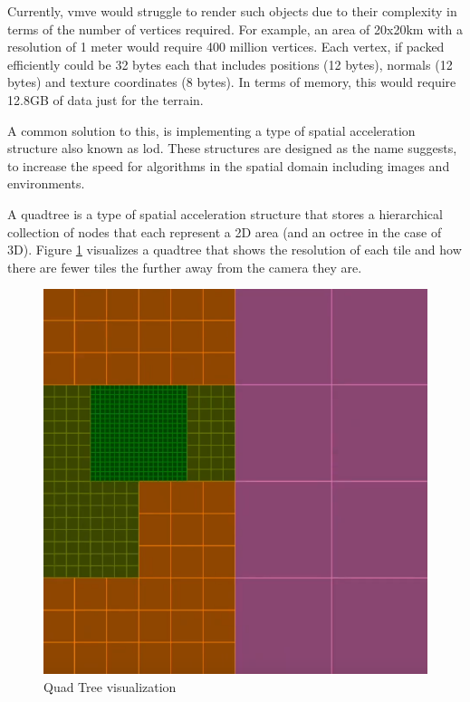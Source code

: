 \documentclass[11pt]{article}
\begin{document}
Currently, \gls*{vmve} would struggle to render such objects due to their
complexity in terms of the number of vertices required. For example, an area of
20x20km with a resolution of 1 meter would require 400 million vertices. Each
vertex, if packed efficiently could be 32 bytes each that includes positions (12
bytes), normals (12 bytes) and texture coordinates (8 bytes). In terms of
memory, this would require 12.8GB of data just for the terrain.

A common solution to this, is implementing a type of spatial acceleration
structure also known as \gls*{lod}. These structures are designed as the name
suggests, to increase the speed for algorithms in the spatial domain including
images and environments.

A quadtree is a type of spatial acceleration structure that stores a
hierarchical collection of nodes that each represent a 2D area (and an octree in
the case of 3D). Figure \ref{fig:quad_tree} visualizes a quadtree that shows
the resolution of each tile and how there are fewer tiles the further away from
the camera they are.

\begin{figure}[H]
  \centering
  \includegraphics[width=\textwidth]{images/quad_tree.png}
  \caption{Quad Tree visualization}
  \label{fig:quad_tree}
\end{figure}
\end{document}

